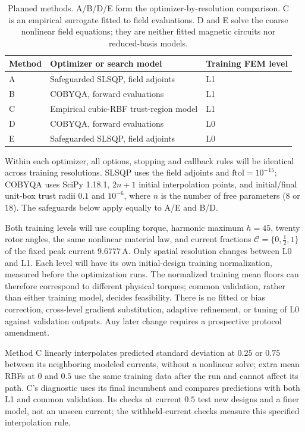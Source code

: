 \begin{table}[ht]
\centering
\begin{tabular}{lll}
\toprule
Method & Optimizer or search model & Training FEM level \\
\midrule
A & Safeguarded SLSQP, field adjoints & L1 \\
B & COBYQA, forward evaluations & L1 \\
C & Empirical cubic-RBF trust-region model & L1 \\
D & COBYQA, forward evaluations & L0 \\
E & Safeguarded SLSQP, field adjoints & L0 \\
\bottomrule
\end{tabular}
\caption{Planned methods. A/B/D/E form the optimizer-by-resolution comparison.
C is an empirical surrogate fitted to field evaluations. D and E solve the
coarse nonlinear field equations; they are neither fitted magnetic circuits
nor reduced-basis models.}
\label{tab:planned-methods}
\end{table}

Within each optimizer, all options, stopping and callback rules will be
identical across training resolutions. SLSQP uses the field adjoints and
$\mathrm{ftol}=10^{-15}$; COBYQA uses SciPy 1.18.1, $2n+1$ initial interpolation
points, and initial/final unit-box trust radii $0.1$ and $10^{-6}$, where
$n$ is the number of free parameters (8 or 18).
The safeguards below apply equally to A/E and B/D.

Both training levels will use coupling torque, harmonic maximum $h=45$, twenty rotor angles,
the same nonlinear material law, and current fractions
$\mathcal C=\{0,\tfrac12,1\}$ of the fixed peak current $9.6777\,\mathrm{A}$.
Only spatial resolution changes between L0 and L1. Each level will have its own
initial-design training normalization, measured before the optimization runs.
The normalized training mean floors can therefore correspond to different
physical torques; common validation, rather than either training model,
decides feasibility. There is no fitted or bias correction, cross-level
gradient substitution, adaptive refinement, or tuning of L0 against validation
outputs. Any later change requires a prospective protocol amendment.

Method C linearly interpolates predicted standard deviation at $0.25$ or
$0.75$ between its neighboring modeled currents, without a nonlinear solve; extra mean RBFs at $0$ and $0.5$ use the same training data after
the run and cannot affect its path. C's diagnostic uses its final incumbent
and compares predictions with both L1 and common validation. Its checks at
current $0.5$ test new designs and a finer model, not an unseen current;
the withheld-current checks measure this specified interpolation rule.

